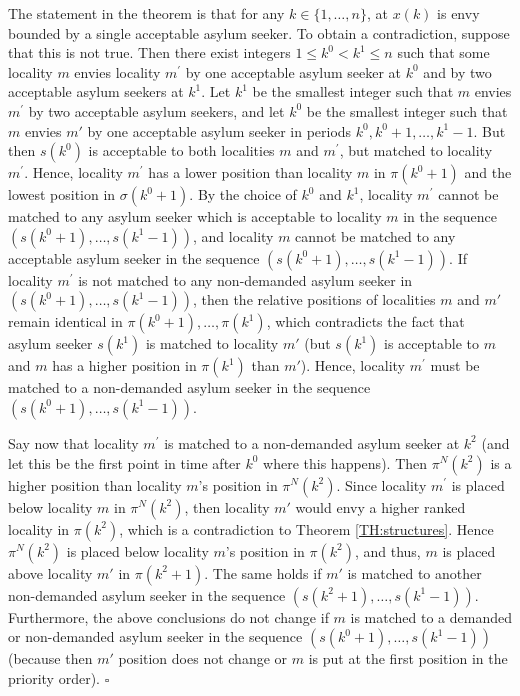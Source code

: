 \documentclass[12pt,fleqn]{article}
\begin{document}
The statement in the theorem is that for any $k\in \{1,\ldots,n\}$, at $x(k)$ is envy bounded by a single acceptable asylum seeker. To obtain a contradiction, suppose that this is not true. Then there exist integers $1\leq k^0 <k^1\leq n$ such that some locality $m$ envies locality $m^\prime$ by one acceptable asylum seeker at $k^0$ and by two acceptable asylum seekers at $k^1$. Let $k^1$ be the smallest integer such that $m$ envies $m^\prime$ by two acceptable asylum seekers, and let $k^0$ be the smallest integer such that $m$ envies $m'$ by one acceptable asylum seeker in periods $k^0,k^0+1,\ldots,k^1-1$.
But then $s(k^0)$ is acceptable to both localities $m$ and $m^\prime$, but matched to locality $m^\prime$. Hence, locality $m^\prime$ has a lower position than locality $m$ in $\pi(k^0+1)$ and the lowest position in $\sigma(k^0+1)$. By the choice of $k^0$ and $k^1$, locality $m^\prime$ cannot be matched to any asylum seeker which is acceptable to locality $m$ in the sequence $(s(k^0+1),\ldots,s(k^1-1))$, and locality $m$ cannot be matched to any acceptable asylum seeker in the sequence $(s(k^0+1),\ldots,s(k^1-1))$. If locality $m^\prime$ is not matched to any non-demanded asylum seeker in $(s(k^0+1),\ldots,s(k^1-1))$, then the relative positions of localities $m$ and $m'$ remain identical in $\pi(k^0+1),\ldots,\pi(k^1)$, which contradicts the fact that asylum seeker $s(k^1)$ is matched to locality $m'$ (but $s(k^1)$ is acceptable to $m$ and $m$ has a higher position in $\pi(k^1)$ than $m'$). Hence, locality $m^\prime$ must be matched to a non-demanded asylum seeker in the sequence $(s(k^0+1),\ldots,s(k^1-1))$.

Say now that locality $m^\prime$ is matched to a non-demanded asylum seeker at $k^2$ (and let this be the first point in time after $k^0$ where this happens). Then $\pi^N(k^2)$ is a higher position than locality $m$'s position in $\pi^N(k^2)$. Since locality $m^\prime$ is placed below locality $m$ in $\pi^N(k^2)$, then locality $m'$ would envy a higher ranked locality in $\pi(k^2)$, which is a contradiction to Theorem \ref{TH:structures}. Hence $\pi^N(k^2)$ is placed below locality $m$'s position in $\pi(k^2)$, and thus, $m$ is placed above locality $m'$ in $\pi(k^2+1)$. The same holds if $m'$ is matched to another non-demanded asylum seeker in the sequence $(s(k^2+1),\ldots,s(k^1-1))$. Furthermore, the above conclusions do not change if $m$ is matched to a demanded or non-demanded asylum seeker in the sequence $(s(k^0+1),\ldots,s(k^1-1))$ (because then $m'$ position does not change or $m$ is put at the first position in the priority order). \hfill$\square$



\end{document}
